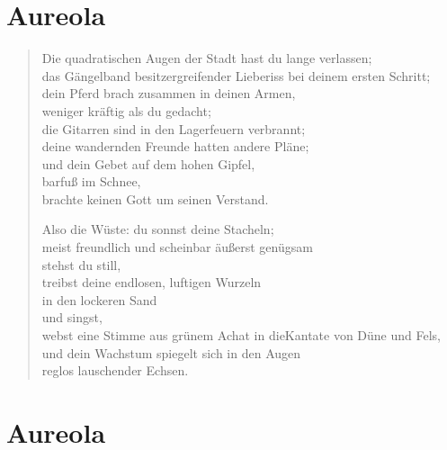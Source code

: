 
\cleartoverso

\section{Aureola}

\begin{verse}

Die quadratischen Augen der Stadt hast du lange verlassen;\\
das Gängelband besitzergreifender Liebe\verselinebreak riss bei deinem ersten Schritt;\\
dein Pferd brach zusammen in deinen Armen,\\
weniger kräftig als du gedacht;\\
die Gitarren sind in den Lagerfeuern verbrannt;\\
deine wandernden Freunde hatten andere Pläne;\\
und dein Gebet auf dem hohen Gipfel,\\
barfuß im Schnee,\\
brachte keinen Gott um seinen Verstand.

Also die Wüste: du sonnst deine Stacheln;\\
meist freundlich und scheinbar äußerst genügsam\\
stehst du still,\\
treibst deine endlosen, luftigen Wurzeln\\
in den lockeren Sand\\
und singst,\\
webst eine Stimme aus grünem Achat in die\verselinebreak Kantate von Düne und Fels,\\
und dein Wachstum spiegelt sich in den Augen\\
reglos lauschender Echsen.

\end{verse}

\clearpage

\section{Aureola}

